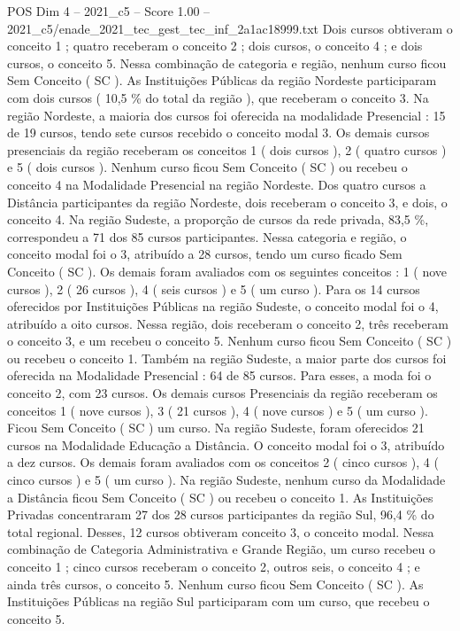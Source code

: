 \begin{textsample}{POS Dim 4 – 2021\_c5 – Score 1.00 – 2021\_c5/enade\_2021\_tec\_gest\_tec\_inf\_2a1ac18999.txt}
Dois cursos obtiveram o conceito 1 ; quatro receberam o conceito 2 ; dois cursos, o conceito 4 ; e dois cursos, o conceito 5.
Nessa combinação de categoria e região, nenhum curso ficou Sem Conceito ( SC ).
As Instituições Públicas da região Nordeste participaram com dois cursos ( 10,5 \% do total da região ), que receberam o conceito 3.
Na região Nordeste, a maioria dos cursos foi oferecida na modalidade Presencial : 15 de 19 cursos, tendo sete cursos recebido o conceito modal 3.
Os demais cursos presenciais da região receberam os conceitos 1 ( dois cursos ), 2 ( quatro cursos ) e 5 ( dois cursos ).
Nenhum curso ficou Sem Conceito ( SC ) ou recebeu o conceito 4 na Modalidade Presencial na região Nordeste.
Dos quatro cursos a Distância participantes da região Nordeste, dois receberam o conceito 3, e dois, o conceito 4.
Na região Sudeste, a proporção de cursos da rede privada, 83,5 \%, correspondeu a 71 dos 85 cursos participantes.
Nessa categoria e região, o conceito modal foi o 3, atribuído a 28 cursos, tendo um curso ficado Sem Conceito ( SC ).
Os demais foram avaliados com os seguintes conceitos : 1 ( nove cursos ), 2 ( 26 cursos ), 4 ( seis cursos ) e 5 ( um curso ).
Para os 14 cursos oferecidos por Instituições Públicas na região Sudeste, o conceito modal foi o 4, atribuído a oito cursos.
Nessa região, dois receberam o conceito 2, três receberam o conceito 3, e um recebeu o conceito 5.
Nenhum curso ficou Sem Conceito ( SC ) ou recebeu o conceito 1.
Também na região Sudeste, a maior parte dos cursos foi oferecida na Modalidade Presencial : 64 de 85 cursos.
Para esses, a moda foi o conceito 2, com 23 cursos.
Os demais cursos Presenciais da região receberam os conceitos 1 ( nove cursos ), 3 ( 21 cursos ), 4 ( nove cursos ) e 5 ( um curso ).
Ficou Sem Conceito ( SC ) um curso.
Na região Sudeste, foram oferecidos 21 cursos na Modalidade Educação a Distância.
O conceito modal foi o 3, atribuído a dez cursos.
Os demais foram avaliados com os conceitos 2 ( cinco cursos ), 4 ( cinco cursos ) e 5 ( um curso ).
Na região Sudeste, nenhum curso da Modalidade a Distância ficou Sem Conceito ( SC ) ou recebeu o conceito 1.
As Instituições Privadas concentraram 27 dos 28 cursos participantes da região Sul, 96,4 \% do total regional.
Desses, 12 cursos obtiveram conceito 3, o conceito modal.
Nessa combinação de Categoria Administrativa e Grande Região, um curso recebeu o conceito 1 ; cinco cursos receberam o conceito 2, outros seis, o conceito 4 ; e ainda três cursos, o conceito 5.
Nenhum curso ficou Sem Conceito ( SC ).
As Instituições Públicas na região Sul participaram com um curso, que recebeu o conceito 5.

\end{textsample}
